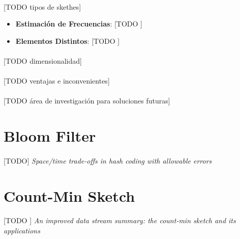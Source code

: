 \documentclass{subfiles}
\begin{document}
        \paragraph{}
        [TODO tipos de skethes]

        \begin{itemize}

          \item \textbf{Estimación de Frecuencias}: [TODO ]

          \item \textbf{Elementos Distintos}: [TODO ]

        \end{itemize}

        \paragraph{}
        [TODO dimensionalidad]

        \paragraph{}
        [TODO ventajas e inconvenientes]

        \paragraph{}
        [TODO área de investigación para soluciones futuras]


    \section{Bloom Filter}
    \label{sec:bloom_filter}

      \paragraph{}
      [TODO] \emph{Space/time trade-offs in hash coding with allowable errors} \cite{bloom1970space}


    \section{Count-Min Sketch}
    \label{sec:count_min_sketch}

      \paragraph{}
      [TODO ] \emph{An improved data stream summary: the count-min sketch and its applications} \cite{cormode2005improved}
\end{document}
